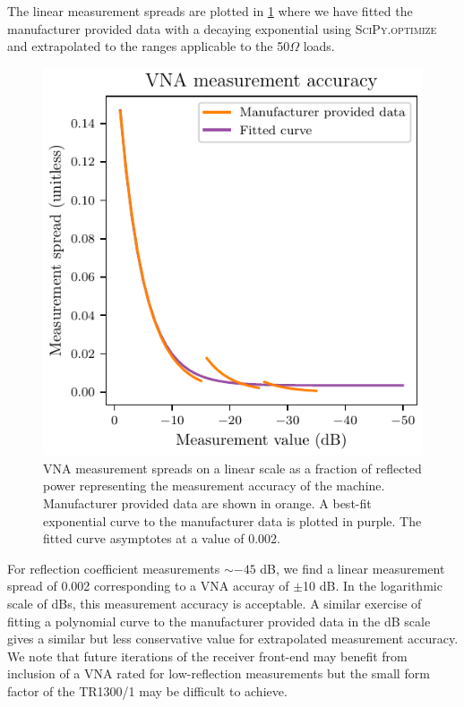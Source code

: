 The linear measurement spreads are plotted in \cref{fig:vna_acc} where we have fitted the manufacturer provided data with a decaying exponential using \textsc{SciPy.optimize} and extrapolated to the ranges applicable to the 50$\Omega$ loads. \begin{figure}
    \centering
    \includegraphics{linear_vna_accuracy}
    \caption{VNA measurement spreads on a linear scale as a fraction of reflected power representing the measurement accuracy of the machine. Manufacturer provided data are shown in orange. A best-fit exponential curve to the manufacturer data is plotted in purple. The fitted curve asymptotes at a value of 0.002.}
    \label{fig:vna_acc}
\end{figure}
For reflection coefficient measurements $\sim -45$ dB, we find a linear measurement spread of 0.002 corresponding to a VNA accuray of $\pm$10 dB. In the logarithmic scale of dBs, this measurement accuracy is acceptable. A similar exercise of fitting a polynomial curve to the manufacturer provided data in the dB scale gives a similar but less conservative value for extrapolated measurement accuracy. We note that future iterations of the receiver front-end may benefit from inclusion of a VNA rated for low-reflection measurements but the small form factor of the TR1300/1 may be difficult to achieve.

